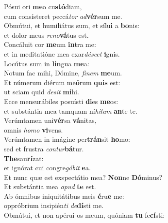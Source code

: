 \evenverse Pósui ori \textbf{me}o cu\textbf{stó}diam,~\*\\
\evenverse cum consísteret peccá\textit{tor} \textit{ad}\textbf{vér}sum me.\\
\oddverse Obmútui, et humiliátus sum, et sílu\textbf{i} a \textbf{bo}nis:~\*\\
\oddverse et dolor meus \textit{re}\textit{no}\textbf{vá}tus est.\\
\evenverse Concáluit cor \textbf{me}um \textbf{in}tra me:~\*\\
\evenverse et in meditatióne mea exar\textit{dé}\textit{scet} \textbf{i}gnis.\\
\oddverse Locútus sum in \textbf{lin}gua \textbf{me}a:~\*\\
\oddverse Notum fac mihi, Dómine, \textit{fi}\textit{nem} \textbf{me}um.\\
\evenverse Et númerum diérum me\textbf{ó}rum \textbf{quis} est:~\*\\
\evenverse ut sciam quid \textit{de}\textit{sit} \textbf{mi}hi.\\
\oddverse Ecce mensurábiles posuísti \textbf{di}es \textbf{me}os:~\*\\
\oddverse et substántia mea tamquam ní\textit{hi}\textit{lum} \textbf{an}te te.\\
\evenverse Verúmtamen uni\textbf{vér}sa \textbf{vá}nitas,~\*\\
\evenverse omnis \textit{ho}\textit{mo} \textbf{vi}vens.\\
\oddverse Verúmtamen in imágine per\textbf{trán}sit \textbf{ho}mo:~\*\\
\oddverse sed et frustra \textit{con}\textit{tur}\textbf{bá}tur.\\
\evenverse \textbf{The}sau\textbf{rí}zat:~\*\\
\evenverse et ignórat cui congre\textit{gá}\textit{bit} \textbf{e}a.\\
\oddverse Et nunc quæ est exspectátio mea? \textbf{Non}ne \textbf{Dó}minus?~\*\\
\oddverse Et substántia mea \textit{a}\textit{pud} \textbf{te} est.\\
\evenverse Ab ómnibus iniquitátibus meis \textbf{é}ru\textbf{e} me:~\*\\
\evenverse oppróbrium insipién\textit{ti} \textit{de}\textbf{dí}sti me.\\
\oddverse Obmútui, et non apérui os meum, quóniam \textbf{tu} fe\textbf{cí}sti:~\*\\
